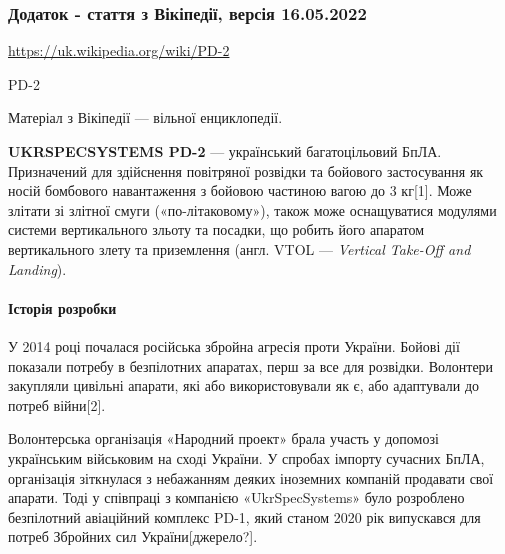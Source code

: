  
 
 
 
 

\subsubsection{Додаток - стаття з Вікіпедії, версія 16.05.2022}
\label{sec:06_05_2022.stz.pc.ua.dou.1.litachok.3.wiki}

\url{https://uk.wikipedia.org/wiki/PD-2}


PD-2

Матеріал з Вікіпедії — вільної енциклопедії.

\textbf{UKRSPECSYSTEMS PD-2} — український багатоцільовий БпЛА. Призначений для
здійснення повітряної розвідки та бойового застосування як носій бомбового
навантаження з бойовою частиною вагою до 3 кг[1]. Може злітати зі злітної смуги
(«по-літаковому»), також може оснащуватися модулями системи вертикального
зльоту та посадки, що робить його апаратом вертикального злету та приземлення
(англ. VTOL — \emph{Vertical Take-Off and Landing}).


\paragraph{Історія розробки}

У 2014 році почалася російська збройна агресія проти України. Бойові дії
показали потребу в безпілотних апаратах, перш за все для розвідки. Волонтери
закупляли цивільні апарати, які або використовували як є, або адаптували до
потреб війни[2].


Волонтерська організація «Народний проект» брала участь у допомозі українським
військовим на сході України. У спробах імпорту сучасних БпЛА, організація
зіткнулася з небажанням деяких іноземних компаній продавати свої апарати. Тоді
у співпраці з компанією «UkrSpecSystems» було розроблено безпілотний авіаційний
комплекс PD-1, який станом 2020 рік випускався для потреб Збройних сил
України[джерело?].

